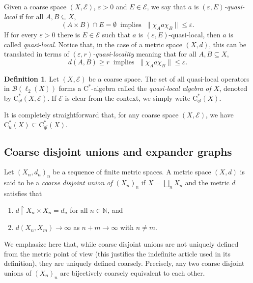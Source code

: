\documentclass[11pt]{amsart}
\newcommand{\N}{\mathbb{N}}
\newcommand{\cB}{\mathcal{B}}
\newcommand{\cE}{\mathcal{E}}
\newcommand{\eps}{\varepsilon}
\newcommand{\cstu}{\mathrm{C}^*_u}
\newcommand{\cstql}{\mathrm{C}^*_{\textit{ql}}}
\newcommand{\cstar}{$\mathrm{C}^*$}
\numberwithin{equation}{section}
\theoremstyle{definition}
\newtheorem{definition}[theorem]{Definition}
\theoremstyle{remark}
\begin{document}
Given a coarse space $(X,\cE)$, $\eps>0$ and $E\in \cE$, we say that $a$ is \emph{$(\eps,E)$-quasi-local} if 
for all $A,B\subseteq X$,
\[(A\times B)\cap E=\emptyset\  \text{ implies }\ \|\chi_A a\chi_B\|\leq \eps.\]
If for every $\eps>0$ there is $E\in \cE$ such that $a$ is $(\eps,E)$-quasi-local, then $a$ is called \emph{quasi-local}. Notice that, in the case of a metric space $(X,d)$, this can be translated in terms of \emph{$(\eps,r)$-quasi-locality} meaning that 
for all $A,B\subseteq X$,
\[d(A,B)\geq r \  \text{ implies }\ \|\chi_A a\chi_B\|\leq \eps.\]
\begin{definition}
    Let $(X,\cE)$ be a coarse space. The set of all quasi-local operators in $\cB(\ell_2(X))$ forms a \cstar-algebra called the   \emph{quasi-local algebra of $X$}, denoted by $\cstql(X,\cE)$. If $\cE$ is clear from the context, we simply write $\cstql(X)$.
\end{definition}

It is completely straightforward that, for any coarse space $(X,\cE)$, we have  $\cstu(X)\subseteq \cstql(X)$.

\subsection{Coarse disjoint unions and expander graphs}\label{Subsection.Coarse.Disj.Union}

Let $(X_n,d_n)_n$ be a sequence of finite metric spaces. A metric space $(X,d)$ is said to be a \emph{coarse disjoint union of $(X_n)_n$} if  $X=\bigsqcup_nX_n$ and the metric $d$ satisfies that
\begin{enumerate}
    \item\label{Item.Metric.p.cdu.1} $d\restriction X_n\times X_n=d_{n}$ for all $n\in\N$, and
    \item \label{Item.Metric.p.cdu.2} $d(X_n,X_m)\to \infty$ as $n+m\to \infty$ with $n\neq m$.
\end{enumerate}
We emphasize here that, while coarse disjoint unions are not uniquely defined from the metric point of view (this justifies the indefinite article used in its definition), they are uniquely defined coarsely. Precisely, any two coarse disjoint unions of $(X_n)_n$ are bijectively coarsely equivalent to each other.

 
\end{document}
